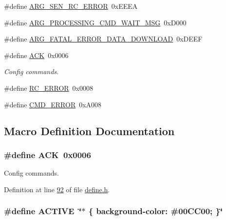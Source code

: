 \begin{DoxyCompactItemize}
\item 
\#define \hyperlink{a00090_a2663000c914acad476f44813681c6b5e}{A\+R\+G\+\_\+\+S\+E\+N\+\_\+\+R\+C\+\_\+\+E\+R\+R\+O\+R}~0x\+E\+E\+E\+A
\item 
\#define \hyperlink{a00090_a89228259ebf351e938853637ef163a1b}{A\+R\+G\+\_\+\+P\+R\+O\+C\+E\+S\+S\+I\+N\+G\+\_\+\+C\+M\+D\+\_\+\+W\+A\+I\+T\+\_\+\+M\+S\+G}~0x\+D000
\item 
\#define \hyperlink{a00090_aedd62437ce5e337b31be5ae516039725}{A\+R\+G\+\_\+\+F\+A\+T\+A\+L\+\_\+\+E\+R\+R\+O\+R\+\_\+\+D\+A\+T\+A\+\_\+\+D\+O\+W\+N\+L\+O\+A\+D}~0x\+D\+E\+E\+F
\item 
\#define \hyperlink{a00090_a6f6489887e08bff4887d0bc5dcf214d8}{A\+C\+K}~0x0006
\begin{DoxyCompactList}\small\item\em Config commands. \end{DoxyCompactList}\item 
\#define \hyperlink{a00090_a993a04d3d34ab3326d1786c66e3aaa1a}{R\+C\+\_\+\+E\+R\+R\+O\+R}~0x0008
\item 
\#define \hyperlink{a00090_a1764a522e9c1a59a59be8757c69fa494}{C\+M\+D\+\_\+\+E\+R\+R\+O\+R}~0x\+A008
\end{DoxyCompactItemize}


\subsection{Macro Definition Documentation}
\hypertarget{a00090_a6f6489887e08bff4887d0bc5dcf214d8}{
\subsubsection[{A\+C\+K}]{\setlength{\rightskip}{0pt plus 5cm}\#define A\+C\+K~0x0006}}\label{a00090_a6f6489887e08bff4887d0bc5dcf214d8}


Config commands. 



Definition at line \hyperlink{a00090_source_l00092}{92} of file \hyperlink{a00090_source}{define.\+h}.

\hypertarget{a00090_a3a6d3cd70078e6046471ec528a09cd19}{
\subsubsection[{A\+C\+T\+I\+V\+E}]{\setlength{\rightskip}{0pt plus 5cm}\#define A\+C\+T\+I\+V\+E~\char`\"{}$\ast$ \{ background-\/color\+: \#00\+C\+C00; \}\char`\"{}}}\label{a00090_a3a6d3cd70078e6046471ec528a09cd19}


